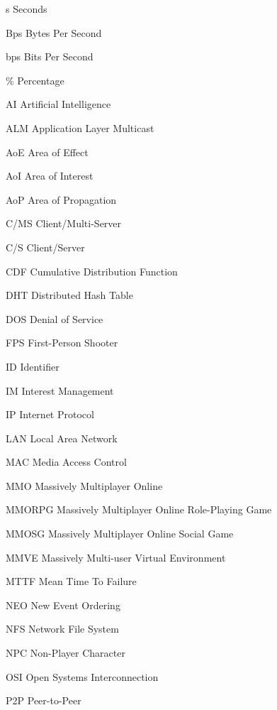 \begin{Nomencl}[\gnat]
        \item[s]        Seconds
        \item[Bps]      Bytes Per Second
        \item[bps]      Bits Per Second
        \item[\%]       Percentage
        \item[AI]       Artificial Intelligence
        \item[ALM]      Application Layer Multicast
        \item[AoE]      Area of Effect
        \item[AoI]      Area of Interest
        \item[AoP]      Area of Propagation
        \item[C/MS]     Client/Multi-Server
        \item[C/S]      Client/Server
        \item[CDF]      Cumulative Distribution Function
        \item[DHT]      Distributed Hash Table
        \item[DOS]      Denial of Service
        \item[FPS]      First-Person Shooter
        \item[ID]       Identifier
        \item[IM]       Interest Management
        \item[IP]       Internet Protocol
        \item[LAN]      Local Area Network
        \item[MAC]      Media Access Control
        \item[MMO]		Massively Multiplayer Online
        \item[MMORPG]   Massively Multiplayer Online Role-Playing Game
        \item[MMOSG]    Massively Multiplayer Online Social Game
  		\item[MMVE]		Massively Multi-user Virtual Environment
        \item[MTTF]     Mean Time To Failure
        \item[NEO]      New Event Ordering
        \item[NFS]      Network File System
        \item[NPC]      Non-Player Character
        \item[OSI]      Open Systems Interconnection
        \item[P2P]      Peer-to-Peer

\end{Nomencl}
